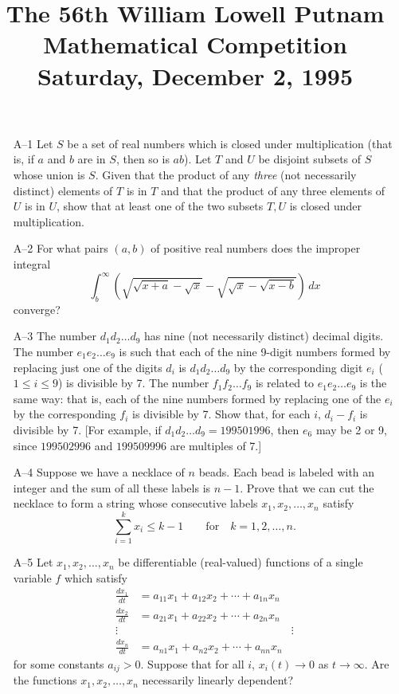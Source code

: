 \documentclass[amssymb,twocolumn,pra,10pt,aps]{revtex4-1}
\begin{document}
\title{The 56th William Lowell Putnam Mathematical Competition \\
    Saturday, December 2, 1995\vspace{-2\baselineskip}}
\maketitle

\begin{itemize}
\item[A--1] Let $S$ be a set of real numbers which is closed under
multiplication (that is, if $a$ and $b$ are in $S$, then so is $ab$).
Let $T$ and $U$ be disjoint subsets of $S$ whose union is $S$. Given
that the product of any {\em three} (not necessarily distinct)
elements of $T$ is in $T$ and that the product of any three elements
of $U$ is in $U$, show that at least one of the two subsets $T,U$ is
closed under multiplication.

\item[A--2] For what pairs $(a,b)$ of positive real numbers does the
improper integral
\[
\int_{b}^{\infty} \left( \sqrt{\sqrt{x+a}-\sqrt{x}} -
\sqrt{\sqrt{x}-\sqrt{x-b}} \right)\,dx
\]
converge?

\item[A--3] The number $d_{1}d_{2}\dots d_{9}$ has nine (not
necessarily distinct) decimal digits. The number $e_{1}e_{2}\dots
e_{9}$ is such that each of the nine 9-digit numbers formed by
replacing just one of the digits $d_{i}$ is $d_{1}d_{2}\dots d_{9}$
by the corresponding digit $e_{i}$ ($1 \leq i \leq 9$) is divisible
by 7. The number $f_{1}f_{2}\dots f_{9}$ is related to
$e_{1}e_{2}\dots e_{9}$ is the same way: that is, each of the nine
numbers formed by replacing one of the $e_{i}$ by the corresponding
$f_{i}$ is divisible by 7. Show that, for each $i$, $d_{i}-f_{i}$ is
divisible by 7. [For example, if $d_{1}d_{2}\dots d_{9} = 199501996$,
then $e_{6}$ may be 2 or 9, since $199502996$ and $199509996$ are
multiples of 7.]

\item[A--4] Suppose we have a necklace of $n$ beads. Each bead is
labeled with an integer and the sum of all these labels is $n-1$.
Prove that we can cut the necklace to form a string whose
consecutive labels $x_{1},x_{2},\dots,x_{n}$ satisfy
\[
\sum_{i=1}^{k} x_{i} \leq k-1 \qquad \mbox{for} \quad k=1,2,\dots,n.
\]

\item[A--5] Let $x_{1},x_{2},\dots,x_{n}$ be differentiable
(real-valued) functions of a single variable $f$ which satisfy
\begin{align*}
\frac{dx_{1}}{dt} &= a_{11}x_{1} + a_{12}x_{2} + \cdots +
a_{1n}x_{n} \\
\frac{dx_{2}}{dt} &= a_{21}x_{1} + a_{22}x_{2} + \cdots +
a_{2n}x_{n} \\
\vdots && \vdots \\
\frac{dx_{n}}{dt} &= a_{n1}x_{1} + a_{n2}x_{2} + \cdots +
a_{nn}x_{n}
\end{align*}
for some constants $a_{ij}>0$. Suppose that for all $i$, $x_{i}(t)
\to 0$ as $t \to \infty$. Are the functions $x_{1},x_{2},\dots,x_{n}$
necessarily linearly dependent?


\end{itemize}
\end{document}
